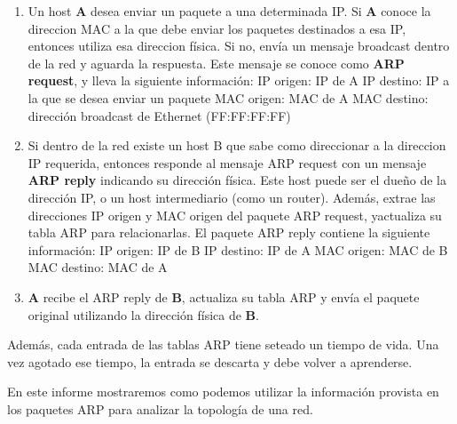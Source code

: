 \begin{enumerate}
	\item Un host \textbf{A} desea enviar un paquete a una determinada IP. Si \textbf{A} conoce la direccion MAC a la que debe enviar los paquetes destinados a esa IP, entonces utiliza esa direccion física. Si no, envía un mensaje broadcast dentro de la red  y aguarda la respuesta. Este mensaje se conoce como \textbf{ARP request}, y lleva la siguiente información:
		\subitem IP origen: IP de A
		\subitem IP destino: IP a la que se desea enviar un paquete
		\subitem MAC origen: MAC de A
		\subitem MAC destino: dirección broadcast de Ethernet (FF:FF:FF:FF)
	
	\item Si dentro de la red existe un host B que sabe como direccionar a la direccion IP requerida, entonces responde al mensaje ARP request con un mensaje \textbf{ARP reply} indicando su dirección física. Este host puede ser el dueño de la dirección IP, o un host intermediario (como un router). Además, extrae las direcciones IP origen y MAC origen del paquete ARP request, yactualiza su tabla ARP para relacionarlas.
	El paquete ARP reply contiene la siguiente información:
		\subitem IP origen: IP de B
		\subitem IP destino: IP de A
		\subitem MAC origen: MAC de B
		\subitem MAC destino: MAC de A

	\item \textbf{A} recibe el ARP reply de \textbf{B}, actualiza su tabla ARP y envía el paquete original utilizando la dirección física de \textbf{B}.
\end{enumerate}

Además, cada entrada de las tablas ARP tiene seteado un tiempo de vida. Una vez agotado ese tiempo, la entrada se descarta y debe volver a aprenderse. 

En este informe mostraremos como podemos utilizar la información provista en los paquetes ARP para analizar la topología de una red.



